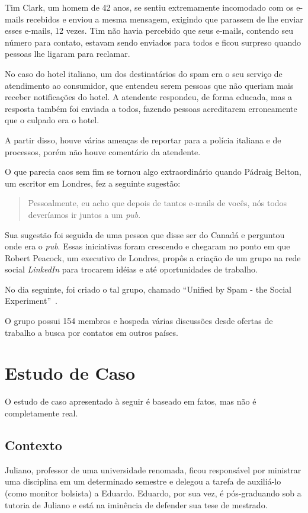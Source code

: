 \documentclass[a4paper,dvipdfm]{article}
\begin{document}
		Tim Clark, um homem de 42 anos, se sentiu extremamente incomodado com os e-mails recebidos e enviou a mesma mensagem, exigindo que parassem de lhe enviar esses e-mails, 12 vezes.
		Tim não havia percebido que seus e-mails, contendo seu número para contato, estavam sendo enviados para todos e ficou surpreso quando pessoas lhe ligaram para reclamar.
	
		No caso do hotel italiano, um dos destinatários do spam era o seu serviço de atendimento ao consumidor, que entendeu serem pessoas que não queriam mais receber notificações do hotel.
		A atendente respondeu, de forma educada, mas a resposta também foi enviada a todos, fazendo pessoas acreditarem erroneamente que o culpado era o hotel.
		
		A partir disso, houve várias ameaças de reportar para a polícia italiana e de processos, porém não houve comentário da atendente.
		
		O que parecia caos sem fim se tornou algo extraordinário quando Pádraig Belton, um escritor em Londres, fez a seguinte sugestão:
		 
		\begin{quotation}
			Pessoalmente, eu acho que depois de tantos e-mails de vocês, nós todos deveríamos ir juntos a um \emph{pub}.
		\end{quotation}
		
		Sua sugestão foi seguida de uma pessoa que disse ser do Canadá e perguntou onde era o \emph{pub}.
		Essas iniciativas foram crescendo e chegaram no ponto em que Robert Peacock, um executivo de Londres, propôs a criação de um grupo na rede social \emph{LinkedIn} para trocarem idéias e até oportunidades de trabalho.
	
		No dia seguinte, foi criado o tal grupo, chamado ``Unified by Spam - the Social Experiment''~\cite{ubs}.
		
		O grupo possui 154 membros e hospeda várias discussões desde ofertas de trabalho a busca por contatos em outros países.
		
\newpage
\section{Estudo de Caso}
	O estudo de caso apresentado à seguir é baseado em fatos, mas não é completamente real. 

	\subsection{Contexto}	
    Juliano, professor de uma universidade renomada, ficou responsável por ministrar uma disciplina em um determinado semestre e delegou a tarefa de auxiliá-lo (como monitor bolsista) a Eduardo. 
	Eduardo, por sua vez, é pós-graduando sob a tutoria de Juliano e está na iminência de defender sua tese de mestrado.
\end{document}
